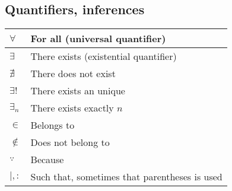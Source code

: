 \documentclass{article}
\begin{document}
\subsection{Quantifiers, inferences}
\begin{xltabular}{\textwidth}{XX}
	\(\forall\)                  & For all (universal quantifier) \cite{grahamConcreteMathematicsFoundation1989}                                                                                                                                \\ \hline
	\(\exists\)                  & There exists (existential quantifier) \cite{grahamConcreteMathematicsFoundation1989}                                                                                                                         \\ \hline
	\(\nexists\)                 & There does not exist \cite{grahamConcreteMathematicsFoundation1989}                                                                                                                                          \\ \hline
	\(\exists!\)                 & There exists an unique \cite{grahamConcreteMathematicsFoundation1989}                                                                                                                                        \\ \hline
	\(\exists_{n}\)              & There exists exactly \(n\) \cite{rosenDiscreteMathematicsIts2011}                                                                                                                                            \\ \hline
	\(\in\)                      & Belongs to \cite{grahamConcreteMathematicsFoundation1989}                                                                                                                                                    \\ \hline
	\(\not\in\)                  & Does not belong to \cite{grahamConcreteMathematicsFoundation1989}                                                                                                                                            \\ \hline
	\(\because\)                 & Because \cite{grahamConcreteMathematicsFoundation1989}                                                                                                                                                       \\ \hline
	\(\mid, :\)                  & Such that, sometimes that parentheses is used \cite{grahamConcreteMathematicsFoundation1989}                                                                                                                 \\ \hline

\end{xltabular}
\end{document}
